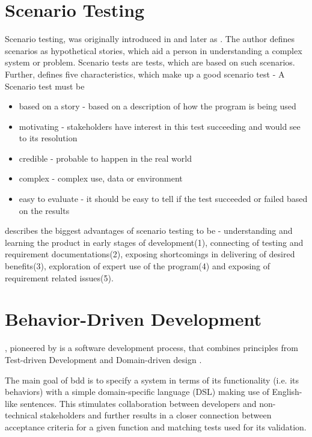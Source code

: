 \section{Scenario Testing}
Scenario testing, was originally introduced in \textcite{kaner2003power} and later as \textcite{kaner2013introduction}. The author defines scenarios as hypothetical stories, which aid a person in understanding a complex system or problem. Scenario tests are tests, which are based on such scenarios.  \parencite[1]{kaner2013introduction}
Further, \parencite[2-5]{kaner2003power} defines five characteristics, which make up a good scenario test -
A Scenario test must be
\begin{itemize}
     \item based on a story - based on a description of how the program is being used
    \item motivating - stakeholders have interest in this test succeeding and would see to its resolution
    \item credible - probable to happen in the real world
    \item complex - complex use, data or environment
    \item easy to evaluate - it should be easy to tell if the test succeeded or failed based on the results 
\end{itemize}

\textcite{kaner2013introduction} describes the biggest advantages of scenario testing to be  - understanding and learning the product in early stages of development(1), connecting of testing and requirement documentations(2), exposing shortcomings in delivering of desired benefits(3), exploration of expert use of the program(4) and exposing of requirement related issues(5).

\section{Behavior-Driven Development}
\label{fundamentals:bdd}
, pioneered by \textcite{north2006behavior} is a software development
process, that combines principles from Test-driven Development and Domain-driven design \parencite{evans2004domain}.

The main goal of \gls{bdd} is to specify a system in terms of its functionality (i.e. its behaviors) with a simple domain-specific language (DSL) making use of English-like sentences. This stimulates collaboration between developers and non-technical stakeholders and further results in a closer connection between acceptance criteria for a given function and matching tests used for its validation.

